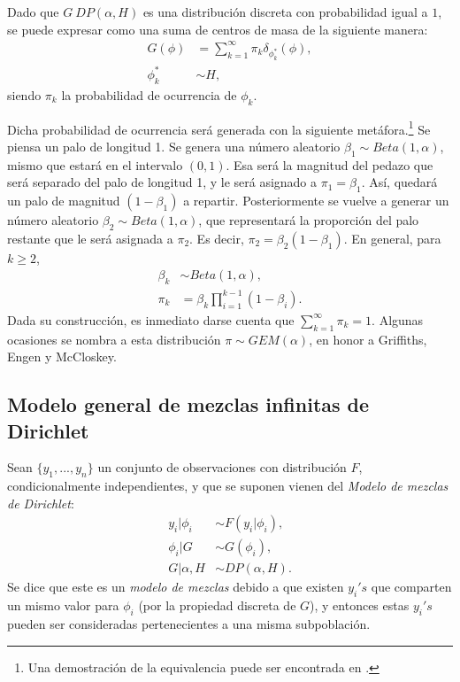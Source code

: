 Dado que $G ~ DP(\alpha,H)$  es una distribuci\'on discreta con probabilidad igual a $1$, se puede expresar como una suma de centros de masa de la siguiente manera:
\begin{equation*}
\begin{aligned}
G(\phi) &= \sum_{k=1}^\infty \pi_k \delta_{\phi_k^*}(\phi),\\
   \phi_k^* &\sim H,
\end{aligned}
\end{equation*}
siendo $\pi_k$ la probabilidad de ocurrencia de $\phi_k$.

Dicha probabilidad de ocurrencia ser\'a generada con la siguiente met\'afora.\footnote{Una demostraci\'on de la equivalencia puede ser encontrada en \cite{Paisley_SB}.} Se piensa un palo de longitud 1. Se genera una n\'umero aleatorio $\beta_1 \sim Beta(1,\alpha)$, mismo que estar\'a en el intervalo $(0,1)$. Esa ser\'a la magnitud del pedazo que ser\'a separado del palo de longitud 1, y le ser\'a asignado a $\pi_1 = \beta_1$. As\'i, quedar\'a un palo de magnitud $(1-\beta_1)$ a repartir. Posteriormente se vuelve a generar un n\'umero aleatorio $\beta_2 \sim Beta(1,\alpha)$, que representar\'a la proporci\'on del palo restante que le ser\'a asignada a $\pi_2$. Es decir, $\pi_2 = \beta_2(1-\beta_1)$. En general, para $k \geq 2$,
\begin{equation*}
\begin{aligned}
   \beta_k &\sim Beta(1,\alpha),\\
   \pi_k &= \beta_k \prod_{i=1}^{k-1}(1 - \beta_i).
\end{aligned}
\end{equation*}
Dada su construcci\'on, es inmediato darse cuenta que $\sum_{k=1}^\infty \pi_k = 1$. Algunas ocasiones se nombra a esta distribuci\'on $\pi \sim GEM(\alpha)$, en honor a Griffiths, Engen y McCloskey.

\subsection{Modelo general de mezclas infinitas de Dirichlet}

Sean $\{y_1,...,y_n\}$ un conjunto de observaciones con distribuci\'on $F$, condicionalmente independientes, y que se suponen vienen del \textit{Modelo de mezclas de Dirichlet}:
\begin{equation*}
\begin{aligned}
   y_i | \phi_i &\sim F(y_i | \phi_i), \\
   \phi_i | G &\sim G(\phi_i), \\
   G | \alpha, H &\sim DP(\alpha,H).
\end{aligned}
\end{equation*}
Se dice que este es un \textit{modelo de mezclas} debido a que existen $y_i's$ que comparten un mismo valor para $\phi_i$ (por la propiedad discreta de $G$), y entonces estas $y_i's$ pueden ser consideradas pertenecientes a una misma subpoblaci\'on.

